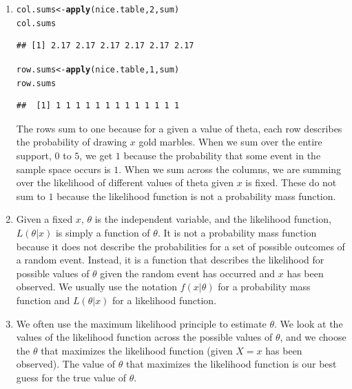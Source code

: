 \documentclass[12pt]{article}\usepackage[]{graphicx}\usepackage[]{color}
\makeatletter
\newcommand{\hlnum}[1]{\textcolor[rgb]{0.686,0.059,0.569}{#1}}%
\newcommand{\hlstd}[1]{\textcolor[rgb]{0.345,0.345,0.345}{#1}}%
\newcommand{\hlkwb}[1]{\textcolor[rgb]{0.69,0.353,0.396}{#1}}%
\newcommand{\hlkwd}[1]{\textcolor[rgb]{0.737,0.353,0.396}{\textbf{#1}}}%
\newenvironment{kframe}{%
 \def\at@end@of@kframe{}%
 \ifinner\ifhmode%
  \def\at@end@of@kframe{\end{minipage}}%
  \begin{minipage}{\columnwidth}%
 \fi\fi%
 \def\FrameCommand##1{\hskip\@totalleftmargin \hskip-\fboxsep
 \colorbox{shadecolor}{##1}\hskip-\fboxsep
     \hskip-\linewidth \hskip-\@totalleftmargin \hskip\columnwidth}%
 \MakeFramed {\advance\hsize-\width
   \@totalleftmargin\z@ \linewidth\hsize
   \@setminipage}}%
 {\par\unskip\endMakeFramed%
 \at@end@of@kframe}
\newenvironment{knitrout}{}{} %
\makeatother
\begin{document}
\begin{doublespacing}
\begin{enumerate}
\item 

\begin{knitrout}\footnotesize
{}\color{fgcolor}\begin{kframe}
\begin{alltt}
\hlstd{col.sums} \hlkwb{<-} \hlkwd{apply}\hlstd{(nice.table,} \hlnum{2}\hlstd{, sum)}
\hlstd{col.sums}
\end{alltt}
\begin{verbatim}
## [1] 2.17 2.17 2.17 2.17 2.17 2.17
\end{verbatim}
\begin{alltt}
\hlstd{row.sums} \hlkwb{<-} \hlkwd{apply}\hlstd{(nice.table,} \hlnum{1}\hlstd{, sum)}
\hlstd{row.sums}
\end{alltt}
\begin{verbatim}
##  [1] 1 1 1 1 1 1 1 1 1 1 1 1 1
\end{verbatim}
\end{kframe}
\end{knitrout}

The rows sum to one because for a given a value of theta, each row describes the probability of drawing $x$ gold marbles. When we sum over the entire support, $0$ to $5$, we get $1$ because the probability that some event in the sample space occurs is $1$. When we sum across the columns, we are summing over the likelihood of different values of theta given $x$ is fixed. These do not sum to $1$ because the likelihood function is not a probability mass function.

\item Given a fixed $x$, $\theta$ is the independent variable, and the likelihood function, $L(\theta|x)$ is simply a function of $\theta$. It is not a probability mass function because it does not describe the probabilities for a set of possible outcomes of a random event. Instead, it is a function that describes the likelihood for possible values of $\theta$ given the random event has occurred and $x$ has been observed. We usually use the notation $f(x|\theta)$ for a probability mass function and $L(\theta|x)$ for a likelihood function.

\item We often use the maximum likelihood principle to estimate $\theta$. We look at the values of the likelihood function across the possible values of $\theta$, and we choose the $\theta$ that maximizes the likelihood function (given $X=x$ has been observed). The value of $\theta$ that maximizes the likelihood function is our best guess for the true value of $\theta$. 


\end{enumerate}
\end{doublespacing}
\end{document}
